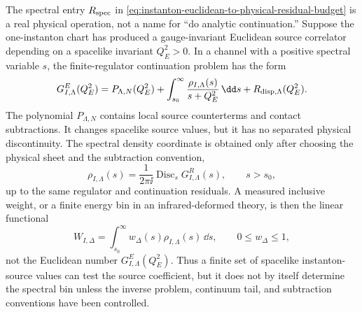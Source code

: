 \begin{controlledapproximation}
\label{ca:instanton-spectral-continuation-source-correlator}
The spectral entry \(R_{\rm spec}\) in
\eqref{eq:instanton-euclidean-to-physical-residual-budget} is a real physical
operation, not a name for ``do analytic continuation.''  Suppose the
one-instanton chart has produced a gauge-invariant Euclidean source correlator
depending on a spacelike invariant \(Q_E^2>0\).  In a channel with a positive
spectral variable \(s\), the finite-regulator continuation problem has the form
\begin{equation}
  G_{I,\Lambda}^{E}(Q_E^2)
  =
  P_{\Lambda,N}(Q_E^2)
  +
  \int_{s_0}^{\infty}
  \frac{\rho_{I,\Lambda}(s)}{s+Q_E^2}\,\dd s
  +
  R_{\rm disp,\Lambda}(Q_E^2).
  \label{eq:instanton-source-dispersion-coordinate}
\end{equation}
The polynomial \(P_{\Lambda,N}\) contains local source counterterms and contact
subtractions.  It changes spacelike source values, but it has no separated
physical discontinuity.  The spectral density coordinate is obtained only after
choosing the physical sheet and the subtraction convention,
\[
  \rho_{I,\Lambda}(s)
  =
  \frac{1}{2\pi\ii}
  \operatorname{Disc}_{s}
  G_{I,\Lambda}^{R}(s),
  \qquad s>s_0,
\]
up to the same regulator and continuation residuals.  A measured inclusive
weight, or a finite energy bin in an infrared-deformed theory, is then the
linear functional
\begin{equation}
  W_{I,\Delta}
  =
  \int_{s_0}^{\infty}w_\Delta(s)\rho_{I,\Lambda}(s)\,\dd s,
  \qquad
  0\le w_\Delta\le1,
  \label{eq:instanton-spectral-projection-functional}
\end{equation}
not the Euclidean number
\(G_{I,\Lambda}^{E}(Q_E^2)\).  Thus a finite set of spacelike instanton-source
values can test the source coefficient, but it does not by itself determine the
spectral bin unless the inverse problem, continuum tail, and subtraction
conventions have been controlled.


\end{controlledapproximation}
